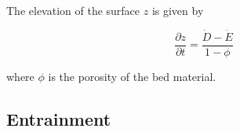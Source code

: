 \documentclass[11pt]{article}
\begin{document}
The elevation of the surface $z$ is given by

\begin{equation}
\frac{\partial z}{\partial t} = \frac{\dot{D} - \dot{E}}{1 - \phi}
\end{equation}

\noindent where $\phi$ is the porosity of the bed material.

\subsection{Entrainment}

%
%
% 
%
%
%
%
%
%
%
%
\end{document}
